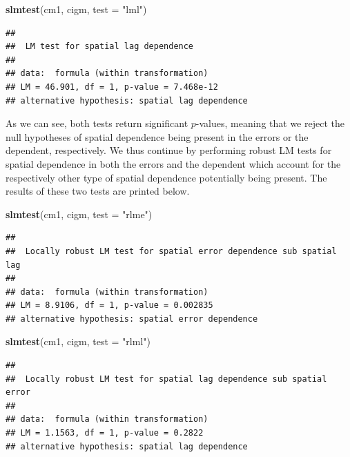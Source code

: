 \documentclass[
  a4paper,
]{article}
\newenvironment{Shaded}{\begin{snugshade}}{\end{snugshade}}
\newcommand{\AttributeTok}[1]{\textcolor[rgb]{0.13,0.29,0.53}{#1}}
\newcommand{\FunctionTok}[1]{\textcolor[rgb]{0.13,0.29,0.53}{\textbf{#1}}}
\newcommand{\NormalTok}[1]{#1}
\newcommand{\StringTok}[1]{\textcolor[rgb]{0.31,0.60,0.02}{#1}}
\begin{document}
\begin{Shaded}
\begin{Highlighting}[]
\FunctionTok{slmtest}\NormalTok{(cm1, cigm, }\AttributeTok{test =} \StringTok{"lml"}\NormalTok{)}
\end{Highlighting}
\end{Shaded}

\begin{verbatim}
## 
##  LM test for spatial lag dependence
## 
## data:  formula (within transformation)
## LM = 46.901, df = 1, p-value = 7.468e-12
## alternative hypothesis: spatial lag dependence
\end{verbatim}

As we can see, both tests return significant \(p\)-values, meaning that
we reject the null hypotheses of spatial dependence being present in the
errors or the dependent, respectively. We thus continue by performing
robust LM tests for spatial dependence in both the errors and the
dependent which account for the respectively other type of spatial
dependence potentially being present. The results of these two tests are
printed below.

\begin{Shaded}
\begin{Highlighting}[]
\FunctionTok{slmtest}\NormalTok{(cm1, cigm, }\AttributeTok{test =} \StringTok{"rlme"}\NormalTok{)}
\end{Highlighting}
\end{Shaded}

\begin{verbatim}
## 
##  Locally robust LM test for spatial error dependence sub spatial lag
## 
## data:  formula (within transformation)
## LM = 8.9106, df = 1, p-value = 0.002835
## alternative hypothesis: spatial error dependence
\end{verbatim}

\begin{Shaded}
\begin{Highlighting}[]
\FunctionTok{slmtest}\NormalTok{(cm1, cigm, }\AttributeTok{test =} \StringTok{"rlml"}\NormalTok{)}
\end{Highlighting}
\end{Shaded}

\begin{verbatim}
## 
##  Locally robust LM test for spatial lag dependence sub spatial error
## 
## data:  formula (within transformation)
## LM = 1.1563, df = 1, p-value = 0.2822
## alternative hypothesis: spatial lag dependence
\end{verbatim}
\end{document}
